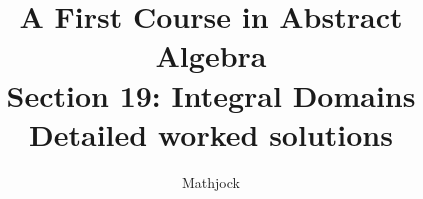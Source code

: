 
\title{\textbf{A First Course in Abstract Algebra}\\[0.3em]Section 19: Integral Domains\\[0.3em]\large Detailed worked solutions}
\author{Mathjock}
\date{}

\maketitle
\bookinfo
\tableofcontents
\clearpage
\renewcommand{\thesection}{19}
\renewcommand{\theHsection}{fraleigh.19}



